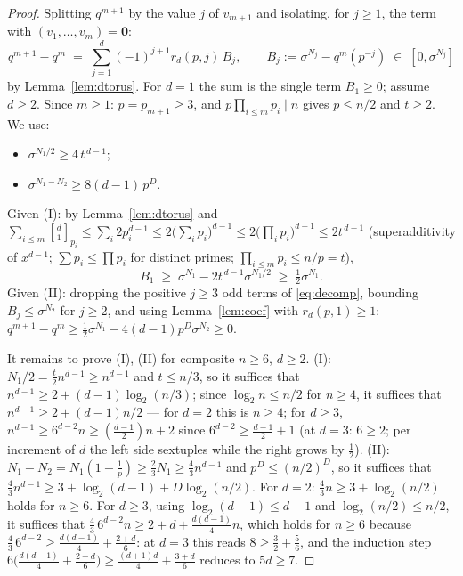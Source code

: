 \documentclass[11pt,a4paper]{article}
\theoremstyle{remark}
\newcommand{\gaussbinom}[2]{\genfrac{[}{]}{0pt}{}{#1}{#2}}
\begin{document}
\begin{proof}
Splitting $q^{m+1}$ by the value $j$ of $v_{m+1}$ and isolating, for
$j\ge1$, the term with $(v_1,\dots,v_m)=\mathbf 0$:
\begin{equation}\label{eq:decomp}
  q^{m+1}-q^m\;=\;\sum_{j=1}^{d}(-1)^{j+1}r_d(p,j)\,B_j,
  \qquad B_j:=\sigma^{N_j}-q^m(p^{-j})\;\in\;[0,\sigma^{N_j}]
\end{equation}
by Lemma~\ref{lem:dtorus}. For $d=1$ the sum is the single term
$B_1\ge0$; assume $d\ge2$. Since $m\ge1$: $p=p_{m+1}\ge3$, and
$p\prod_{i\le m}p_i\mid n$ gives $p\le n/2$ and $t\ge2$. We use:
\begin{itemize}
\item[(I)] $\sigma^{N_1/2}\ge 4\,t^{\,d-1}$;
\item[(II)] $\sigma^{N_1-N_2}\ge 8(d-1)\,p^{D}$.
\end{itemize}
Given (I): by Lemma~\ref{lem:dtorus} and
$\sum_{i\le m}\gaussbinom d1_{p_i}\le\sum_i2p_i^{d-1}
\le2\bigl(\sum_ip_i\bigr)^{d-1}\le2\bigl(\prod_ip_i\bigr)^{d-1}
\le2t^{\,d-1}$ (superadditivity of $x^{d-1}$; $\sum p_i\le\prod p_i$ for
distinct primes; $\prod_{i\le m}p_i\le n/p=t$),
\[
  B_1\;\ge\;\sigma^{N_1}-2t^{\,d-1}\sigma^{N_1/2}\;\ge\;
  \tfrac12\sigma^{N_1}.
\]
Given (II): dropping the positive $j\ge3$ odd terms of \eqref{eq:decomp},
bounding $B_j\le\sigma^{N_2}$ for $j\ge2$, and using
Lemma~\ref{lem:coef} with $r_d(p,1)\ge1$:
$q^{m+1}-q^m\ge\tfrac12\sigma^{N_1}-4(d-1)p^{D}\sigma^{N_2}\ge0$.

It remains to prove (I), (II) for composite $n\ge6$, $d\ge2$. (I):
$N_1/2=\tfrac t2n^{d-1}\ge n^{d-1}$ and $t\le n/3$, so it suffices that
$n^{d-1}\ge2+(d-1)\log_2(n/3)$; since $\log_2 n\le n/2$ for $n\ge4$, it
suffices that $n^{d-1}\ge2+(d-1)n/2$ --- for $d=2$ this is $n\ge4$; for
$d\ge3$, $n^{d-1}\ge6^{d-2}n\ge(\tfrac{d-1}2)n+2$ since
$6^{d-2}\ge\tfrac{d-1}2+1$ (at $d=3$: $6\ge2$; per increment of $d$ the
left side sextuples while the right grows by $\tfrac12$). (II):
$N_1-N_2=N_1(1-\tfrac1p)\ge\tfrac23N_1\ge\tfrac43n^{d-1}$ and
$p^D\le(n/2)^D$, so it suffices that
$\tfrac43n^{d-1}\ge3+\log_2(d-1)+D\log_2(n/2)$. For $d=2$:
$\tfrac43n\ge3+\log_2(n/2)$ holds for $n\ge6$. For $d\ge3$, using
$\log_2(d-1)\le d-1$ and $\log_2(n/2)\le n/2$, it suffices that
$\tfrac43\,6^{d-2}n\ge2+d+\tfrac{d(d-1)}4n$, which holds for $n\ge6$
because $\tfrac43\,6^{d-2}\ge\tfrac{d(d-1)}4+\tfrac{2+d}6$: at $d=3$
this reads $8\ge\tfrac32+\tfrac56$, and the induction step
$6\bigl(\tfrac{d(d-1)}4+\tfrac{2+d}6\bigr)\ge
\tfrac{(d+1)d}4+\tfrac{3+d}6$ reduces to $5d\ge7$.
\end{proof}
\end{document}

